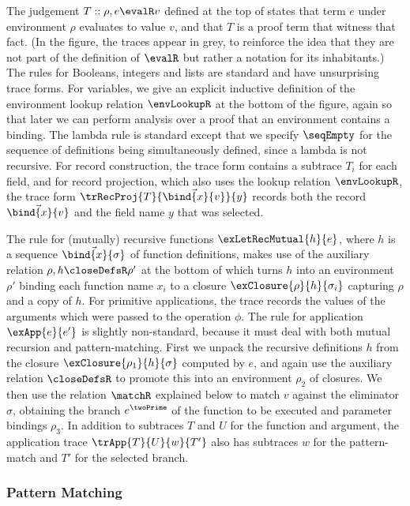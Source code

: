 The judgement $T :: \rho, e \evalR v$ defined at the top of  states that term $e$ under environment $\rho$ evaluates to value $v$, and that $T$ is a proof term that witness that fact. (In the figure, the traces appear in grey, to reinforce the idea that they are not part of the definition of $\evalR$ but rather a notation for its inhabitants.) The rules for Booleans, integers and lists are standard and have unsurprising trace forms. For variables, we give an explicit inductive definition of the environment lookup relation $\envLookupR$ at the bottom of the figure, again so that later we can perform analysis over a proof that an environment contains a binding. The lambda rule is standard except that we specify $\seqEmpty$ for the sequence of definitions being simultaneously defined, since a lambda is not recursive. For record construction, the trace form contains a subtrace $T_i$ for each field, and for record projection, which also uses the lookup relation $\envLookupR$, the trace form $\trRecProj{T}{\vec{\bind{x}{v}}}{y}$ records both the record $\vec{\bind{x}{v}}$ and the field name $y$ that was selected.

The rule for (mutually) recursive functions $\exLetRecMutual{h}{e}$, where $h$ is a sequence $\vec{\bind{x}{\sigma}}$ of function definitions, makes use of the auxiliary relation $\rho, h \closeDefsR \rho'$ at the bottom of  which turns $h$ into an environment $\rho'$ binding each function name $x_i$ to a closure $\exClosure{\rho}{h}{\sigma_i}$ capturing $\rho$ and a copy of $h$. For primitive applications, the trace records the values of the arguments which were passed to the operation $\phi$. The rule for application $\exApp{e}{e'}$ is slightly non-standard, because it must deal with both mutual recursion and pattern-matching. First we unpack the recursive definitions $h$ from the closure $\exClosure{\rho_1}{h}{\sigma}$ computed by $e$, and again use the auxiliary relation $\closeDefsR$ to promote this into an environment $\rho_2$ of closures. We then use the relation $\matchR$ explained below to match $v$ against the eliminator $\sigma$, obtaining the branch $e^\twoPrime$ of the function to be executed and parameter bindings $\rho_3$. In addition to subtraces $T$ and $U$ for the function and argument, the application trace $\trApp{T}{U}{w}{T'}$ also has subtraces $w$ for the pattern-match and $T'$ for the selected branch.

\subsubsection{Pattern Matching}
\label{sec:core-language:pattern-match}

